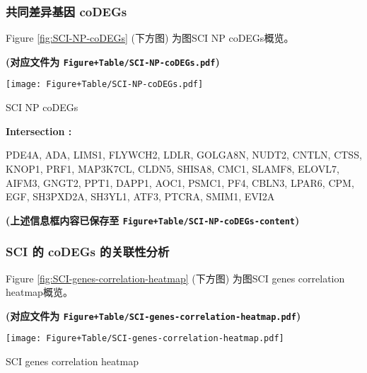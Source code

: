 \documentclass[
]{article}
\begin{document}
\hypertarget{ux5171ux540cux5deeux5f02ux57faux56e0-codegs}{%
\subsubsection{共同差异基因 coDEGs}\label{ux5171ux540cux5deeux5f02ux57faux56e0-codegs}}

Figure \ref{fig:SCI-NP-coDEGs} (下方图) 为图SCI NP coDEGs概览。

\textbf{(对应文件为 \texttt{Figure+Table/SCI-NP-coDEGs.pdf})}

\def\@captype{figure}
\begin{center}
\texttt{[image: Figure+Table/SCI-NP-coDEGs.pdf]}
\caption{SCI NP coDEGs}\label{fig:SCI-NP-coDEGs}
\end{center}
\begin{center}\begin{tcolorbox}[colback=gray!10, colframe=gray!50, width=0.9\linewidth, arc=1mm, boxrule=0.5pt]
\textbf{
Intersection
:}

\vspace{0.5em}

    PDE4A, ADA, LIMS1, FLYWCH2, LDLR, GOLGA8N, NUDT2,
CNTLN, CTSS, KNOP1, PRF1, MAP3K7CL, CLDN5, SHISA8, CMC1,
SLAMF8, ELOVL7, AIFM3, GNGT2, PPT1, DAPP1, AOC1, PSMC1,
PF4, CBLN3, LPAR6, CPM, EGF, SH3PXD2A, SH3YL1, ATF3, PTCRA,
SMIM1, EVI2A

\vspace{2em}
\end{tcolorbox}
\end{center}

\textbf{(上述信息框内容已保存至 \texttt{Figure+Table/SCI-NP-coDEGs-content})}

\hypertarget{sci-ux7684-codegs-ux7684ux5173ux8054ux6027ux5206ux6790}{%
\subsubsection{SCI 的 coDEGs 的关联性分析}\label{sci-ux7684-codegs-ux7684ux5173ux8054ux6027ux5206ux6790}}

Figure \ref{fig:SCI-genes-correlation-heatmap} (下方图) 为图SCI genes correlation heatmap概览。

\textbf{(对应文件为 \texttt{Figure+Table/SCI-genes-correlation-heatmap.pdf})}

\def\@captype{figure}
\begin{center}
\texttt{[image: Figure+Table/SCI-genes-correlation-heatmap.pdf]}
\caption{SCI genes correlation heatmap}\label{fig:SCI-genes-correlation-heatmap}
\end{center}
\end{document}
